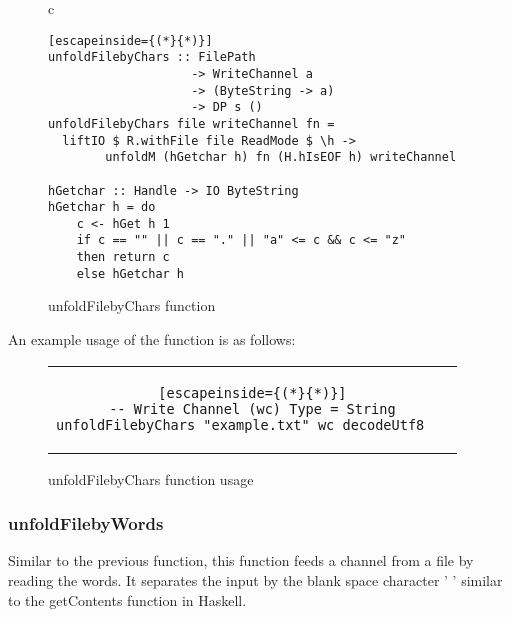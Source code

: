 \begin{figure}[H]
    \begin{tabular}{c}
        \begin{lstlisting}[escapeinside={(*}{*)}]
unfoldFilebyChars :: FilePath 
                    -> WriteChannel a 
                    -> (ByteString -> a) 
                    -> DP s ()
unfoldFilebyChars file writeChannel fn =
  liftIO $ R.withFile file ReadMode $ \h -> 
        unfoldM (hGetchar h) fn (H.hIsEOF h) writeChannel

hGetchar :: Handle -> IO ByteString
hGetchar h = do
    c <- hGet h 1
    if c == "" || c == "." || "a" <= c && c <= "z" 
    then return c 
    else hGetchar h
        \end{lstlisting}
    \end{tabular}
    \caption{unfoldFilebyChars function}
    \label{fig:HC21}
\end{figure}

An example usage of the function is as follows:

\begin{figure}[H]
    \begin{tabular}{c}
        \begin{lstlisting}[escapeinside={(*}{*)}]
-- Write Channel (wc) Type = String
unfoldFilebyChars "example.txt" wc decodeUtf8	
        \end{lstlisting}
    \end{tabular}
    \caption{unfoldFilebyChars function usage}
    \label{fig:HC21b}
\end{figure}

\subsubsection*{unfoldFilebyWords}
Similar to the previous function, this function feeds a channel from a file by reading the words.
It separates the input by the blank space character ' ' similar to the getContents function in Haskell. \\

